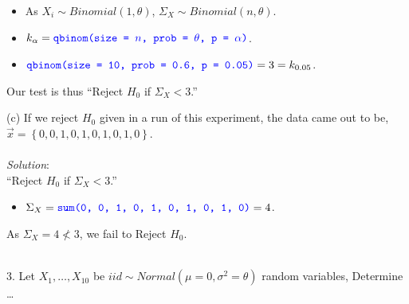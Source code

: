 \documentclass[12pt]{article}
\newcommand{\XB}{\color{black}}
\newcommand{\XBB}{\color{blue}}
\newcommand{\ds}{\displaystyle}
\begin{document}
\begin{itemize}
    \item As $ X_{i} \sim Binomial(1, \theta) $, $ \Sigma_{X} \sim Binomial(n, \theta) $.
    \item $ \ds k_{\alpha} = {\XBB \texttt{qbinom(size = $ n $, prob = $ \theta $, p = $ \alpha $)}} $.
    \item $ \ds {\XBB \texttt{qbinom(size = 10, prob = 0.6, p = 0.05)}} = 3 = k_{0.05} $.
\end{itemize}

\noindent
Our test is thus ``Reject $ H_{0} $ if $ \Sigma_{X} < 3 $.'' \\

\vspace{2.5mm}

\newpage

(c) If we reject $ H_{0} $ given in a run of this experiment, the data came out to be,
$ \overrightarrow{x}  = \left\{ 0, 0, 1, 0, 1, 0, 1, 0, 1, 0 \right\} $. \\
\vspace{2.5mm} \\
\textit{Solution}:
\vspace{2.5mm} \\

\noindent
``Reject $ H_{0} $ if $ \Sigma_{X} < 3 $.''

\begin{itemize}
    \item $ \ds \Sigma_{X} = {\XBB \texttt{sum(0, 0, 1, 0, 1, 0, 1, 0, 1, 0)}} = 4 $.
\end{itemize}
As $ \Sigma_{X} = 4 \nless 3 $, we fail to Reject $ H_{0} $. \\

\vspace{2.5mm}

\newpage
\XBB\hrulefill\XB \\

3. Let $ X_{1}, \dots , X_{10} $ be $ iid \sim Normal(\mu=0, \sigma^{2}=\theta) $ random variables, Determine \dots \\

\XBB\hrulefill\XB
\vspace{5mm}
\end{document}
